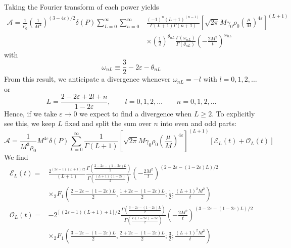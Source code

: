 Taking the Fourier transform of each power yields
\begin{equation}
\begin{split}
	\mathcal{A} = \frac{1}{\rho_{0}} \left( \frac{1}{M^{2}} \right)^{(3 - 4\varepsilon)/2} \delta(P) \sum_{L = 0}^{\infty} \sum_{n = 0}^{\infty} {}& \frac{(-1)^{n}(L+1)^{(n - 1)}}{\Gamma(L + 1) \Gamma(n+1)} \left[ \sqrt{2 \pi} M \gamma_{0} \rho_{0} \left( \frac{\mu}{M} \right)^{4\varepsilon} \right]^{(L+1)} \\
	&\times \left(\frac{1}{2}\right)^{\theta_{nL}} \frac{\Gamma(\omega_{nL})}{\Gamma(\theta_{nL})} \left( - \frac{2M^{2}}{t} \right)^{\omega_{nL}}
\end{split}
\end{equation}
with
\begin{equation}
	\omega_{nL} \equiv \frac{3}{2} - 2\varepsilon - \theta_{nL}
\end{equation}
From this result, we anticipate a divergence whenever $\omega_{nL} = -l$ with $l = 0,1,2, \ldots$ or
\begin{equation}
	L = \frac{2 - 2\varepsilon + 2 l + n}{1 - 2\varepsilon}, \qquad l = 0, 1, 2, \ldots \qquad n = 0, 1, 2, \ldots
\end{equation}
Hence, if we take $\varepsilon \rightarrow 0$ we expect to find a divergence when $L \geq 2 $. To explicitly see this, we keep $L$ fixed and split the sum over $n$ into even and odd parts:
\begin{equation}
	\mathcal{A} = \frac{1}{M^{3}\rho_{0}} M^{4\varepsilon} \delta(P) \sum_{L = 0}^{\infty} \frac{1}{\Gamma(L + 1)} \left[ \sqrt{2 \pi} M \gamma_{0} \rho_{0} \left( \frac{\mu}{M} \right)^{4\varepsilon} \right]^{(L+1)} [\mathcal{E}_{L}(t) + \mathcal{O}_{L}(t)]
\end{equation}
We find
\begin{align}
	\mathcal{E}_{L}(t) = {}& \frac{2^{(2 \varepsilon - 1)(L + 1)/2}}{(L + 1)} \frac{\Gamma\left( \frac{2 - 2\varepsilon - (1 - 2\varepsilon) L}{2} \right)}{\Gamma\left( \frac{(L + 1)(1 - 2\varepsilon)}{2} \right)} \left( - \frac{2M^{2}}{t} \right)^{(2 - 2\varepsilon - (1 - 2\varepsilon)L)/2} \nonumber \\
	&\times {}_{2}F_{1}\left( \frac{2 - 2\varepsilon - (1 - 2\varepsilon)L}{2}, \frac{1 + 2\varepsilon - (1 - 2\varepsilon)L}{2}; \frac{1}{2}; \frac{(L+1)^{2}M^{2}}{t} \right) \\
	\mathcal{O}_{L}(t) = {}& - 2^{[(2 \varepsilon - 1)(L + 1) + 1]/2} \frac{\Gamma\left( \frac{3 - 2\varepsilon - (1 - 2\varepsilon)L}{2} \right)}{\Gamma \left( \frac{L(1 - 2\varepsilon) - 2\varepsilon}{2} \right)} \left( - \frac{2M^{2}}{t} \right)^{(3 - 2\varepsilon - (1 - 2\varepsilon)L)/2} \nonumber \\
	&\times {}_{2}F_{1}\left( \frac{3 - 2\varepsilon - (1 - 2\varepsilon)L}{2}, \frac{2 + 2\varepsilon - (1 - 2\varepsilon)L}{2}; \frac{3}{2}; \frac{(L+1)^{2}M^{2}}{t} \right)
\end{align}
